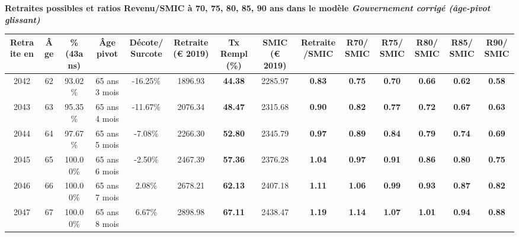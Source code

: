  \vspace{0.1cm} 
{\bf \noindent Retraites possibles et ratios Revenu/SMIC à 70, 75, 80, 85, 90 ans dans le modèle \emph{Gouvernement corrigé (âge-pivot glissant)}}  
 
\begin{adjustbox}{max width=\textwidth} 
\begin{tabular}[htb]{|c|c||c|c|c||c|c||c|c||c|c|c|c|c|} 
\hline 
 Retraite en &  Âge &  \%(43ans) &  Âge pivot &  Décote/Surcote &  Retraite (\euro{} 2019) &  Tx Rempl(\%) &  SMIC (\euro{} 2019) &  Retraite/SMIC &  R70/SMIC &  R75/SMIC &  R80/SMIC &  R85/SMIC &  R90/SMIC \\ 
\hline \hline 
 2042 &  62 &  93.02\% &  65 ans 3 mois &  -16.25\% &  1896.93 &  {\bf 44.38} &  2285.97 &  {\bf {\color{red} 0.83}} &  {\bf {\color{red} 0.75}} &  {\bf {\color{red} 0.70}} &  {\bf {\color{red} 0.66}} &  {\bf {\color{red} 0.62}} &  {\bf {\color{red} 0.58}} \\ 
\hline 
 2043 &  63 &  95.35\% &  65 ans 4 mois &  -11.67\% &  2076.34 &  {\bf 48.47} &  2315.68 &  {\bf {\color{red} 0.90}} &  {\bf {\color{red} 0.82}} &  {\bf {\color{red} 0.77}} &  {\bf {\color{red} 0.72}} &  {\bf {\color{red} 0.67}} &  {\bf {\color{red} 0.63}} \\ 
\hline 
 2044 &  64 &  97.67\% &  65 ans 5 mois &  -7.08\% &  2266.30 &  {\bf 52.80} &  2345.79 &  {\bf {\color{red} 0.97}} &  {\bf {\color{red} 0.89}} &  {\bf {\color{red} 0.84}} &  {\bf {\color{red} 0.79}} &  {\bf {\color{red} 0.74}} &  {\bf {\color{red} 0.69}} \\ 
\hline 
 2045 &  65 &  100.00\% &  65 ans 6 mois &  -2.50\% &  2467.39 &  {\bf 57.36} &  2376.28 &  {\bf 1.04} &  {\bf {\color{red} 0.97}} &  {\bf {\color{red} 0.91}} &  {\bf {\color{red} 0.86}} &  {\bf {\color{red} 0.80}} &  {\bf {\color{red} 0.75}} \\ 
\hline 
 2046 &  66 &  100.00\% &  65 ans 7 mois &  2.08\% &  2678.21 &  {\bf 62.13} &  2407.18 &  {\bf 1.11} &  {\bf 1.06} &  {\bf {\color{red} 0.99}} &  {\bf {\color{red} 0.93}} &  {\bf {\color{red} 0.87}} &  {\bf {\color{red} 0.82}} \\ 
\hline 
 2047 &  67 &  100.00\% &  65 ans 8 mois &  6.67\% &  2898.98 &  {\bf 67.11} &  2438.47 &  {\bf 1.19} &  {\bf 1.14} &  {\bf 1.07} &  {\bf 1.01} &  {\bf {\color{red} 0.94}} &  {\bf {\color{red} 0.88}} \\ 
\hline 
\hline 
\end{tabular} 
\end{adjustbox} 
 

